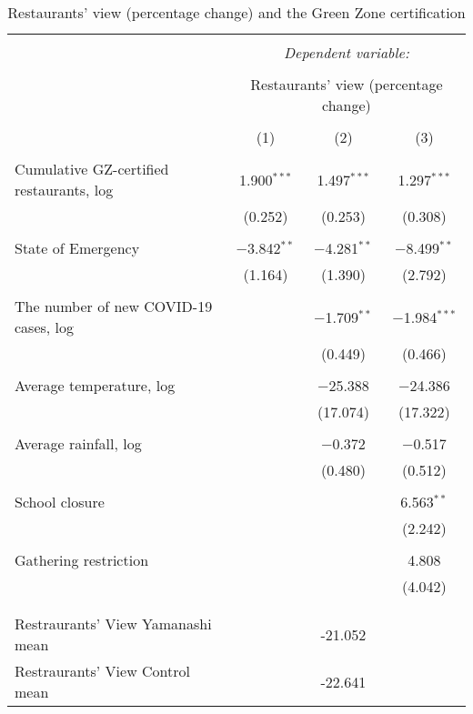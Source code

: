
\begin{table}[!htbp] \centering 
  \caption{Restaurants' view (percentage change) and the Green Zone certification} 
  \label{} 
\footnotesize 
\begin{tabular}{@{\extracolsep{1pt}}lccc} 
\\[-1.8ex]\hline 
\hline \\[-1.8ex] 
 & \multicolumn{3}{c}{\textit{Dependent variable:}} \\ 
\cline{2-4} 
\\[-1.8ex] & \multicolumn{3}{c}{Restaurants' view (percentage change) } \\ 
\\[-1.8ex] & (1) & (2) & (3)\\ 
\hline \\[-1.8ex] 
 Cumulative GZ-certified restaurants, log & 1.900$^{***}$ & 1.497$^{***}$ & 1.297$^{***}$ \\ 
  & (0.252) & (0.253) & (0.308) \\ 
  & & & \\ 
 State of Emergency & $-$3.842$^{**}$ & $-$4.281$^{**}$ & $-$8.499$^{**}$ \\ 
  & (1.164) & (1.390) & (2.792) \\ 
  & & & \\ 
 The number of new COVID-19 cases, log &  & $-$1.709$^{**}$ & $-$1.984$^{***}$ \\ 
  &  & (0.449) & (0.466) \\ 
  & & & \\ 
 Average temperature, log &  & $-$25.388 & $-$24.386 \\ 
  &  & (17.074) & (17.322) \\ 
  & & & \\ 
 Average rainfall, log &  & $-$0.372 & $-$0.517 \\ 
  &  & (0.480) & (0.512) \\ 
  & & & \\ 
 School closure &  &  & 6.563$^{**}$ \\ 
  &  &  & (2.242) \\ 
  & & & \\ 
 Gathering restriction &  &  & 4.808 \\ 
  &  &  & (4.042) \\ 
  & & & \\ 
\hline \\[-1.8ex] 
Restraurants' View Yamanashi mean &  & -21.052 &  \\ 
Restraurants' View Control mean &  & -22.641 &  \\ 

\end{tabular}
\end{table}
